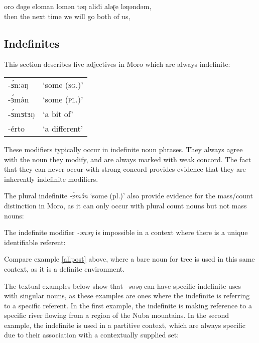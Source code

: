 oro đǝge eloman lomǝn tǝŋ aliđi alǝɽe lǝŋǝndǝm,\\
then the next time we will go both of us,


\subsection{Indefinites}\label{section:indefinite}

This section describes five adjectives in Moro which are always indefinite:

\ea 
 \begin{tabular}[t]{ll}
{-ɜ́n:əŋ}& `some (\textsc{sg}.)'\\
{-ɜ́mə́n} &  `some (\textsc{pl}.)' \\
{-ɜ́mɜtɜŋ} &  `a bit of' \\
{-érto} & `a different' \end{tabular}
\z  
These modifiers typically occur in indefinite noun phrases. They always agree with the noun they modify, and are always marked with weak concord. The fact that they can never occur with strong concord provides evidence that they are inherently indefinite modifiers.  %

The plural indefinite \textit{-ɜ́mə́n} `some (pl.)' also provide evidence for the mass/count distinction in Moro, as it can only occur with plural count nouns but not mass nouns:


The indefinite modifier \textit{-ənəŋ} is impossible in a context where there is a unique identifiable referent: 

\z 
Compare example \ref{allpost} above, where a bare noun for tree is used in this same context, as it is a  definite environment. 


The textual examples below show that \textit{-ənəŋ} can have specific indefinite uses with singular nouns, as these examples are ones where the indefinite is referring to a specific referent. In the first example, the indefinite is making reference to a specific river flowing from a region of the Nuba mountains. In the second example, the indefinite is used in a partitive context, which are always specific due to their association with a contextually supplied set:

